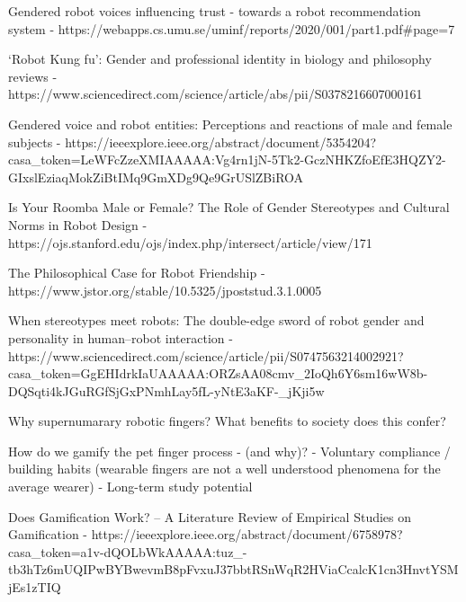 Gendered robot voices influencing trust -
towards a robot recommendation system
 - https://webapps.cs.umu.se/uminf/reports/2020/001/part1.pdf#page=7


‘Robot Kung fu’: Gender and professional identity in biology and philosophy reviews - https://www.sciencedirect.com/science/article/abs/pii/S0378216607000161


Gendered voice and robot entities: Perceptions and reactions of male and female subjects - https://ieeexplore.ieee.org/abstract/document/5354204?casa_token=LeWFcZzeXMIAAAAA:Vg4rn1jN-5Tk2-GczNHKZfoEfE3HQZY2-GIxslEziaqMokZiBtIMq9GmXDg9Qe9GrUSlZBiROA

Is Your Roomba Male or Female? The Role of Gender Stereotypes and Cultural Norms in Robot Design - https://ojs.stanford.edu/ojs/index.php/intersect/article/view/171

The Philosophical Case for Robot Friendship - https://www.jstor.org/stable/10.5325/jpoststud.3.1.0005

When stereotypes meet robots: The double-edge sword of robot gender and personality in human–robot interaction - https://www.sciencedirect.com/science/article/pii/S0747563214002921?casa_token=GgEHIdrkIaUAAAAA:ORZsAA08cmv_2IoQh6Y6sm16wW8b-DQSqti4kJGuRGfSjGxPNmhLay5fL-yNtE3aKF-_jKji5w










Why supernumarary robotic fingers? What benefits to society does this confer? 























How do we gamify the pet finger process - (and why)? 
- Voluntary compliance / building habits (wearable fingers are not a well understood phenomena for the average wearer)
- Long-term study potential


Does Gamification Work? -- A Literature Review of Empirical Studies on Gamification - https://ieeexplore.ieee.org/abstract/document/6758978?casa_token=a1v-dQOLbWkAAAAA:tuz_-tb3hTz6mUQIPwBYBwevmB8pFvxuJ37bbtRSnWqR2HViaCcalcK1cn3HnvtYSMjEs1zTIQ



